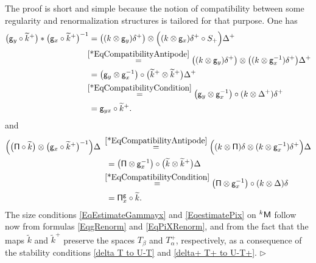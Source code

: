 \documentclass[10pt, reqno]{amsart}
\numberwithin{subsection}{section}
\numberwithin{subsubsection}{subsection}
\numberwithin{equation}{section} %
\newenvironment{Dem}[1][\unskip]{%
    \begin{list}{\hspace{1.15cm}{\sf \textbf{{\small Proof #1 --}}}}{%
        \setlength{\topsep}{0pt}%
        \setlength{\leftmargin}{0pt}%
        \setlength{\rightmargin}{0pt}%
        \setlength{\listparindent}{0pt}%
        \setlength{\itemindent}{0pt}%
        \setlength{\parsep}{0pt}%
        \addtolength{\leftmargin}{0pt}%
        \addtolength{\rightmargin}{0pt}%
    } \item }{\hfill $\rhd$\end{list}\smallskip}
\theoremstyle{mystyle}
\theoremstyle{mystyle2}
\theoremstyle{mystyle3}
\begin{document}
\begin{Dem} 
The proof is short and simple because the notion of compatibility between some regularity and renormalization structures is tailored for that purpose. One has 
\begin{equation*}
\begin{split}
\big({\sf g}_y\circ\widetilde{k}^+\big)*\big({\sf g}_x\circ\widetilde{k}^+\big)^{-1} 
&= \big((k\otimes {\sf g}_y)\delta^+\big)\otimes\Big((k\otimes {\sf g}_x) \delta^+\circ S_+\Big)\Delta^+   \\
&\hspace{-0.15cm}\overset{\eqref{*EqCompatibilityAntipode}}{=} 
\big((k\otimes {\sf g}_y)\delta^+\big)\otimes\big((k\otimes {\sf g}_x^{-1})\delta^+\big)\Delta^+   \\
&= \big({\sf g}_y\otimes {\sf g}_x^{-1}\big)\circ\big(\widetilde{k}^+\otimes\widetilde{k}^+\big)\Delta^+   \\
&\hspace{-0.15cm}\overset{\eqref{*EqCompatibilityCondition}}{=} 
\big({\sf g}_y\otimes {\sf g}_x^{-1}\big)\circ(k\otimes\Delta^+)\delta^+  
 \\
&= {\sf g}_{yx}\circ\widetilde{k}^+.
\end{split}
\end{equation*}
and 
\begin{equation*}
\begin{split}
\Big(\big({\sf \Pi}\circ\widetilde{k}\big)\otimes\big({\sf g}_x\circ\widetilde{k}^+\big)^{-1}\Big)\Delta \ \ 
&\hspace{-0.15cm}\overset{\eqref{*EqCompatibilityAntipode}}{=} 
\Big((k\otimes{\sf \Pi})\delta \otimes (k\otimes {\sf g}_x^{-1})\delta^+\Big)\Delta   \\
&= \big({\sf \Pi}\otimes {\sf g}_x^{-1}\big)\circ\big(\widetilde{k}\otimes\widetilde{k}^+\big)\Delta   \\
&\hspace{-0.15cm}\overset{\eqref{*EqCompatibilityCondition}}{=} 
\big({\sf \Pi}\otimes {\sf g}_x^{-1}\big)\circ(k\otimes\Delta)\delta   \\
&= {\sf\Pi}^{\sf g}_x\circ\widetilde{k}.
\end{split}
\end{equation*}
The size conditions \eqref{EqEstimateGammayx} and \eqref{EqestimatePix} on $^k{\sf M}$ follow now from formulas \eqref{EqgRenorm} and \eqref{EqPiXRenorm}, and from the fact that the maps $\widetilde{k}$ and $\widetilde{k}^+$ preserve the spaces $T_\beta$ and $T_\alpha^+$, respectively, as a consequence of the stability conditions \eqref{delta T to U-T} and \eqref{delta+ T+ to U-T+}.
\end{Dem}
\end{document}

